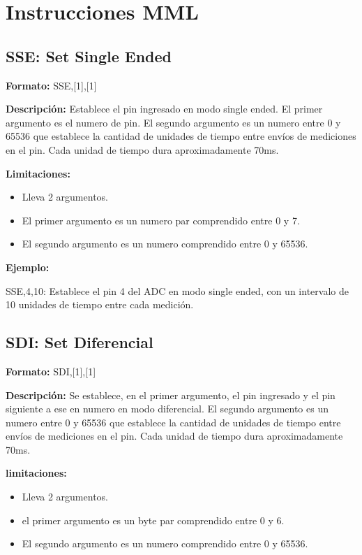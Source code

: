 \appendix

\chapter{Instrucciones MML}\label{ap:instrucciones}

\section{SSE: Set Single Ended} %
\label{sub:sse_set_single_ended}


\textbf{Formato:} SSE,[1],[1]

\textbf{Descripción:}
Establece el pin ingresado en modo single ended. El primer argumento es el numero de pin. El segundo argumento es un numero entre 0 y 65536 que establece la cantidad de unidades de tiempo entre envíos de mediciones en el pin. Cada unidad de tiempo dura aproximadamente 70ms.

\textbf{Limitaciones:}
\begin{itemize}
  \item Lleva 2 argumentos.
  \item El primer argumento es un numero par comprendido entre 0 y 7.
  \item El segundo argumento es un numero comprendido entre 0 y 65536.
\end{itemize}

\textbf{Ejemplo:}

SSE,4,10: Establece el pin 4 del ADC en modo single ended, con un intervalo de 10 unidades de tiempo entre cada medición.


\section{SDI: Set Diferencial} %
\label{sub:sdi_set_diferencial}


\textbf{Formato:} SDI,[1],[1]

\textbf{Descripción:}
Se establece, en el primer argumento, el pin ingresado y el pin siguiente a ese en numero en modo diferencial. El segundo argumento es un numero entre 0 y 65536 que establece la cantidad de unidades de tiempo entre envíos de mediciones en el pin. Cada unidad de tiempo dura aproximadamente 70ms.

\textbf{limitaciones:}
\begin{itemize}
  \item Lleva 2 argumentos.
  \item el primer argumento es un byte par comprendido entre 0 y 6.
  \item El segundo argumento es un numero comprendido entre 0 y 65536.
\end{itemize}


